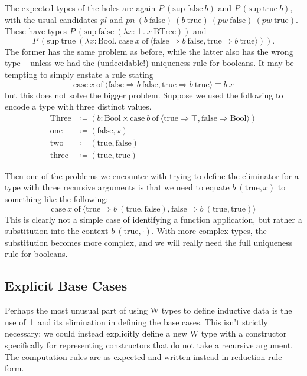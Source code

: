 \documentclass{report}
\newcommand{\BTree}{\const{BTree}}
\newcommand{\Bool}{\const{Bool}}
\newcommand{\true}{\const{true}}
\newcommand{\false}{\const{false}}
\renewcommand{\sup}{\const{sup}}
\newcommand{\const}[1]{\text{#1}}
\newcommand{\case}{\const{case}}
\newcommand{\of}{\const{of}}
\begin{document}
The expected types of the holes are again $P ~ (\sup ~ \false ~ b)$ and $P ~ (\sup ~ \true ~ b)$, with the usual candidates $pl$ and $pn ~ (b ~ \false) ~ (b ~ \true) ~ (pw ~ \false) ~ (pw ~ \true)$. These have types $P ~ (\sup ~ \false ~ (\lambda x: \bot. ~ x ~ \BTree))$ and $$P ~ (\sup ~ \true ~ (\lambda x: \Bool. ~ \case ~ x ~ \of ~ \langle \false \Rightarrow b ~ \false, \true \Rightarrow b ~ \true \rangle)).$$ The former has the same problem as before, while the latter also has the wrong type -- unless we had the (undecidable!) uniqueness rule for booleans. It may be tempting to simply enstate a rule stating $$\case ~ x ~ \of ~ \langle \false \Rightarrow b ~ \false, \true \Rightarrow b ~ \true \rangle \equiv b ~ x$$ but this does not solve the bigger problem. Suppose we used the following to encode a type with three distinct values.
%
\begin{align*}
    \const{Three} &\coloneqq (b: \Bool \times \case ~ b ~ \of ~ \langle \true \Rightarrow \top, \false \Rightarrow \Bool \rangle) \\
    \const{one} &\coloneqq (\false, \star) \\
    \const{two} &\coloneqq (\true, \false) \\
    \const{three} &\coloneqq (\true, \true)
\end{align*}

Then one of the problems we encounter with trying to define the eliminator for a type with three recursive arguments is that we need to equate $b ~ (\true, x)$ to something like the following: $$\case ~ x ~ \of ~ \langle \true \Rightarrow b ~ (\true, \false), \false \Rightarrow b ~ (\true, \true) \rangle$$ This is clearly not a simple case of identifying a function application, but rather a substitution into the context $b ~ (\true, \cdot)$. With more complex types, the substitution becomes more complex, and we will really need the full uniqueness rule for booleans.

\subsection{Explicit Base Cases}

Perhaps the most unusual part of using W types to define inductive data is the use of $\bot$ and its elimination in defining the base cases. This isn't strictly necessary; we could instead explicitly define a new W type with a constructor specifically for representing constructors that do not take a recursive argument. The computation rules are as expected and written instead in reduction rule form.
\end{document}
